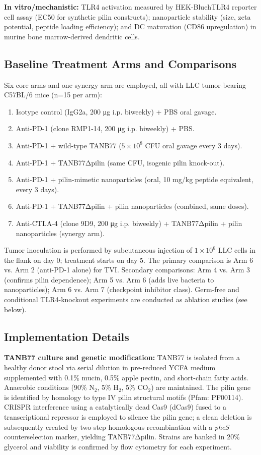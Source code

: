 \documentclass{article}
\begin{document}
\textbf{In vitro/mechanistic:} TLR4 activation measured by HEK-Blue\texttrademark hTLR4 reporter cell assay (EC50 for synthetic pilin constructs); nanoparticle stability (size, zeta potential, peptide loading efficiency); and DC maturation (CD86 upregulation) in murine bone marrow-derived dendritic cells.

\subsection{Baseline Treatment Arms and Comparisons}
Six core arms and one synergy arm are employed, all with LLC tumor-bearing C57BL/6 mice (n=15 per arm):
\begin{enumerate}
    \item Isotype control (IgG2a, 200 μg i.p. biweekly) + PBS oral gavage.
    \item Anti-PD-1 (clone RMP1-14, 200 μg i.p. biweekly) + PBS.
    \item Anti-PD-1 + wild-type TANB77 ($5\times10^8$ CFU oral gavage every 3 days).
    \item Anti-PD-1 + TANB77Δpilin (same CFU, isogenic pilin knock-out).
    \item Anti-PD-1 + pilin-mimetic nanoparticles (oral, 10 mg/kg peptide equivalent, every 3 days).
    \item Anti-PD-1 + TANB77Δpilin + pilin nanoparticles (combined, same doses).
    \item Anti-CTLA-4 (clone 9D9, 200 μg i.p. biweekly) + TANB77Δpilin + pilin nanoparticles (synergy arm).
\end{enumerate}
Tumor inoculation is performed by subcutaneous injection of $1\times10^6$ LLC cells in the flank on day 0; treatment starts on day 5. The primary comparison is Arm 6 vs. Arm 2 (anti-PD-1 alone) for TVI. Secondary comparisons: Arm 4 vs. Arm 3 (confirms pilin dependence); Arm 5 vs. Arm 6 (adds live bacteria to nanoparticles); Arm 6 vs. Arm 7 (checkpoint inhibitor class). Germ-free and conditional TLR4-knockout experiments are conducted as ablation studies (see below).

\subsection{Implementation Details}
\textbf{TANB77 culture and genetic modification:} TANB77 is isolated from a healthy donor stool via serial dilution in pre-reduced YCFA medium supplemented with 0.1\% mucin, 0.5\% apple pectin, and short-chain fatty acids. Anaerobic conditions (90\% N$_2$, 5\% H$_2$, 5\% CO$_2$) are maintained. The pilin gene is identified by homology to type IV pilin structural motifs (Pfam: PF00114). CRISPR interference using a catalytically dead Cas9 (dCas9) fused to a transcriptional repressor is employed to silence the pilin gene; a clean deletion is subsequently created by two-step homologous recombination with a \textit{pheS} counterselection marker, yielding TANB77Δpilin. Strains are banked in 20\% glycerol and viability is confirmed by flow cytometry for each experiment.
\end{document}
